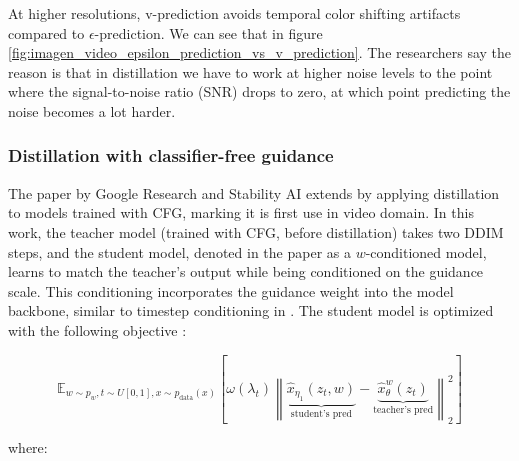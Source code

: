 At higher resolutions, v-prediction avoids temporal color shifting artifacts compared to $\epsilon$-prediction. We can see that in figure \ref{fig:imagen_video_epsilon_prediction_vs_v_prediction}. The researchers say the reason is that in distillation we have to work at higher noise levels to the point where the signal-to-noise ratio (SNR) drops to zero, at which point predicting the noise becomes a lot harder.













\subsubsection*{Distillation with classifier-free guidance}

The paper \cite{meng2023distillation} by Google Research and Stability AI extends \cite{v_prediction} by applying distillation to models trained with CFG, marking it is first use in video domain. In this work, the teacher model (trained with CFG, before distillation) takes two DDIM steps, and the student model, denoted in the paper as a $w$-conditioned model, learns to match the teacher's output while being conditioned on the guidance scale. This conditioning incorporates the guidance weight into the model backbone, similar to timestep conditioning in \cite{kingma2021variational}. The student model is optimized with the following objective \cite{meng2023distillation}:

\begin{equation*}
\mathbb{E}_{w \sim p_w, t \sim U[0, 1], x \sim p_{\text{data}}(x)} 
\left[ 
    \omega(\lambda_t) \left\| 
        \underbrace{\hat{x}_{\eta_1}(z_t, w)}_{\text{student's pred}} - 
        \underbrace{\hat{x}_{\theta}^w(z_t) }_{\text{teacher's pred}}
    \right\|_2^2 
\right]
\end{equation*}

where:

